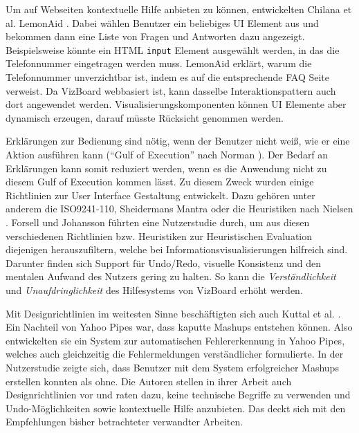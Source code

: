 \documentclass[
	headsepline,
	footsepline,
	fontsize=12pt,
	bibliography=totoc
]{scrbook}
\begin{document}

Um auf Webseiten kontextuelle Hilfe anbieten zu können, entwickelten Chilana et al. LemonAid \cite{Chilana2012}. Dabei wählen Benutzer ein beliebiges UI Element aus und bekommen dann eine Liste von Fragen und Antworten dazu angezeigt. Beispielsweise könnte ein HTML \texttt{input} Element ausgewählt werden, in das die Telefonnummer eingetragen werden muss. LemonAid erklärt, warum die Telefonnummer unverzichtbar ist, indem es auf die entsprechende FAQ Seite verweist. Da VizBoard webbasiert ist, kann dasselbe Interaktionspattern auch dort angewendet werden. Visualisierungskomponenten können UI Elemente aber dynamisch erzeugen, darauf müsste Rücksicht genommen werden.  



Erklärungen zur Bedienung sind nötig, wenn der Benutzer nicht weiß, wie er eine Aktion ausführen kann (\enquote{Gulf of Execution} nach Norman \cite{Norman1986}). Der Bedarf an Erklärungen kann somit reduziert werden, wenn es die Anwendung nicht zu diesem Gulf of Execution kommen lässt. Zu diesem Zweck wurden einige Richtlinien zur User Interface Gestaltung entwickelt. Dazu gehören unter anderem die ISO9241-110, Sheidermans Mantra \cite{Shneiderman1996} oder die Heuristiken nach Nielsen \cite{Nielsen1994}. Forsell und Johansson \cite{Forsell2010} führten eine Nutzerstudie durch, um aus diesen verschiedenen Richtlinien bzw. Heuristiken zur Heuristischen Evaluation \cite{Nielsen1994} diejenigen herauszufiltern, welche bei Informationsvisualisierungen hilfreich sind. Darunter finden sich Support für Undo/Redo, visuelle Konsistenz und den mentalen Aufwand des Nutzers gering zu halten. So kann die \emph{Verständlichkeit} und \emph{Unaufdringlichkeit} des Hilfesystems von VizBoard erhöht werden.


Mit Designrichtlinien im weitesten Sinne beschäftigten sich auch Kuttal et al. \cite{Kuttal2013}. Ein Nachteil von Yahoo Pipes war, dass kaputte Mashups entstehen können. Also entwickelten sie ein System zur automatischen Fehlererkennung in Yahoo Pipes, welches auch gleichzeitig die Fehlermeldungen verständlicher formulierte. In der Nutzerstudie zeigte sich, dass Benutzer mit dem System erfolgreicher Mashups erstellen konnten als ohne. Die Autoren stellen in ihrer Arbeit auch Designrichtlinien vor und raten dazu, keine technische Begriffe zu verwenden und Undo-Möglichkeiten sowie kontextuelle Hilfe anzubieten. Das deckt sich mit den Empfehlungen bisher betrachteter verwandter Arbeiten.
\end{document}
